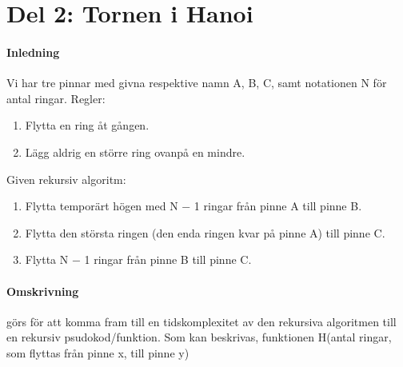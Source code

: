 \section{Del 2: Tornen i Hanoi}
\paragraph{Inledning}    
Vi har tre pinnar med givna respektive namn A, B, C, samt notationen N för antal ringar.
\newline
Regler:
\begin{enumerate}
\item Flytta en ring åt gången.
\item Lägg aldrig en större ring ovanpå en mindre.
\end{enumerate}

\newline
Given rekursiv algoritm:
\begin{enumerate}
	\item Flytta temporärt högen med N − 1 ringar från pinne A till pinne B.
	\item Flytta den största ringen (den enda ringen kvar på pinne A) till pinne C.
	\item Flytta N − 1 ringar från pinne B till pinne C.
\end{enumerate}

\paragraph{Omskrivning}

görs för att komma fram till en tidskomplexitet av den rekursiva algoritmen till
en rekursiv psudokod/funktion. Som kan beskrivas, funktionen H(antal ringar, som flyttas från
pinne x, till pinne y)

